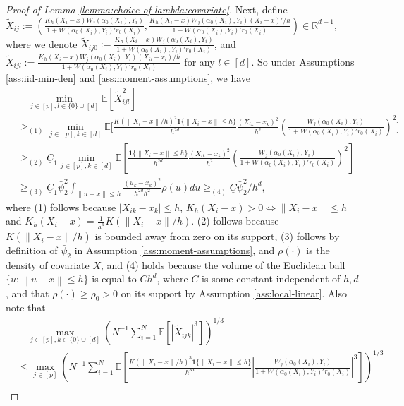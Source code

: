 \documentclass[11pt]{article}
\newcommand{\norm}[1]{\left\lVert #1 \right\rVert}
\begin{document}
\begin{proof}[Proof of Lemma \ref{lemma:choice of lambda:covariate}]
Next, define 
$\tilde X_{ij} := \left(\frac{K_h(X_i-x)W_{j}(\alpha_0(X_i),Y_i)}{1+W(\alpha_0(X_i),Y_i)'r_0(X_i)},\frac{K_h(X_i-x) W_j(\alpha_0(X_i),Y_i)(X_i-x)'/h}{1+W(\alpha_0(X_i),Y_i)'r_0(X_i)}\right)\in\mathbb{R}^{d+1}$, where we denote $\tilde{X}_{ij0}:=\frac{K_h(X_i-x)W_{j}(\alpha_0(X_i),Y_i)}{1+W(\alpha_0(X_i),Y_i)'r_0(X_i)}$, and $\tilde{X}_{ijl}:=\frac{K_h(X_i-x) W_j(\alpha_0(X_i),Y_i)(X_{il}-x_{l})/h}{1+W(\alpha_0(X_i),Y_i)'r_0(X_i)}$ for any $l\in[d]$. So under Assumptions \ref{ass:iid-min-den} and \ref{ass:moment-assumptions}, we have 
$$\begin{array}{rl}
&\displaystyle\quad\min_{j\in[p],l\in\{0\}\cup[d]}\mathbb{E}[\tilde X_{ijl}^2 ]\\
&\displaystyle\geq_{(1)} \min_{j\in[p],k\in[d]}\mathbb{E}\Bigg[\frac{K(\norm{X_i-x}/h)^2\mathbf{1}\{\norm{X_i-x}\leq h\}}{h^{2d}}\frac{(X_{ik}-x_k)^2}{h^2}\left(\frac{W_j(\alpha_0(X_i),Y_i)}{1+W(\alpha_0(X_i),Y_i)'r_0(X_i)}\right)^2\Bigg]\\
&\displaystyle\geq_{(2)}\underline{C}_1\min_{j\in[p],k\in[d]}\mathbb{E}\left[\frac{\mathbf{1}\{\norm{X_i-x}\leq h\}}{h^{2d}}\frac{(X_{ik}-x_k)^2}{h^2}\left(\frac{W_j(\alpha_0(X_i),Y_i)}{1+W(\alpha_0(X_i),Y_i)'r_0(X_i)}\right)^2\right]\\
&\displaystyle\geq_{(3)}\underline{C}_1\bar\psi_2^2\int_{\norm{u-x}\leq h}\frac{(u_k-x_k)^2}{h^{2d}h^2}\rho(u)du\geq_{(4)}\underline{C}\bar\psi_2^2/h^d,
\end{array}$$
where (1) follows because $|X_{ik}-x_k|\leq h$, $K_h(X_i-x)>0\iff\norm{X_i-x}\leq h$ and $K_h(X_i-x)=\frac{1}{h^d}K(\norm{X_i-x}/h)$. (2) follows because $K(\norm{X_i-x}/h)$ is bounded away from zero on its support, (3) follows by definition of $\bar{\psi}_2$ in Assumption \ref{ass:moment-assumptions}, and $\rho(\cdot)$ is the density of covariate $X$, and (4) holds because the volume of the Euclidean ball $\{u:\norm{u-x}\leq h\}$ is equal to $Ch^d$, where $C$ is some constant independent of $h,d$, and that $\rho(\cdot)\geq\rho_0>0$ on its support by Assumption \ref{ass:local-linear}. Also note that  
$$\begin{array}{rl}
&\displaystyle\quad\max_{j\in[p],k\in\{0\}\cup[d]}\left(N^{-1}\sum_{i=1}^N\mathbb{E}[|\tilde X_{ijk}|^3 ]\right)^{1/3}\\ 
&\displaystyle\leq\max_{j\in[p]}\left(N^{-1}\sum_{i=1}^N\mathbb{E}\left[\frac{K(\norm{X_i-x}/h)^3\mathbf{1}\{\norm{X_i-x}\leq h\}}{h^{3d}}\left|\frac{W_j(\alpha_0(X_i),Y_i)}{1+W(\alpha_0(X_i),Y_i)'r_0(X_i)}\right|^3\right]\right)^{1/3}\\

\end{array}$$
\end{proof}
\end{document}
